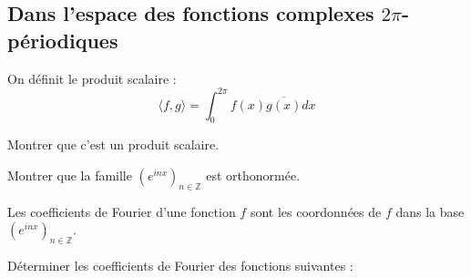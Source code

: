\subsection{Dans l'espace des fonctions complexes $2\pi$-périodiques}

On définit le produit scalaire :
$$
\langle f, g \rangle = \int_{0}^{2\pi} f(x) \overline{g(x)} dx
$$

Montrer que c'est un produit scalaire.

Montrer que la famille $(e^{inx})_{n \in \mathbb{Z}}$ est orthonormée.

Les coefficients de Fourier d'une fonction $f$ sont les coordonnées de $f$ dans la base $(e^{inx})_{n \in \mathbb{Z}}$.

Déterminer les coefficients de Fourier des fonctions suivantes :
{\begin{multicols}{2}}
\begin{enumerate}
\item $\displaystyle \cos(x)$
\item $\displaystyle \sin(2\pi x)$
\item $\displaystyle \cos(x/2)$
\item $\displaystyle \sin(2x) + \cos(3x)$
\item $\displaystyle \exp^{-x}$ sur l'intervalle $[0, 2\pi]$
\end{enumerate}
\ifthenelse{\boolean{showSolutions}}{}{
\end{multicols}
}
